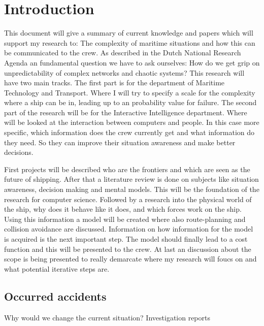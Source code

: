 \section*{Introduction}
\label{sec:introduction}

\noindent This document will give a summary of current knowledge and papers which will support my research to: The complexity of maritime situations and how this can be communicated to the crew.
As described in the Dutch National Research Agenda an fundamental question we have to ask ourselves: How do we get grip on unpredictability of complex networks and chaotic systems? 
This research will have two main tracks. The first part is for the department of Maritime Technology and Transport. Where I will try to specify a scale for the complexity where a ship can be in, leading up to an probability value for failure. The second part of the research will be for the Interactive Intelligence department. Where will be looked at the interaction between computers and people. In this case more specific, which information does the crew currently get and what information do they need. So they can improve their situation awareness and make better decisions.

First projects will be described who are the frontiers and which are seen as the future of shipping.
After that a literature review is done on subjects like situation awareness, decision making and mental models. This will be the foundation of the research for computer science. 
Followed by a research into the physical world of the ship, why does it behave like it does, and which forces work on the ship. Using this information a model will be created where also route-planning and collision avoidance are discussed. 
Information on how information for the model is acquired is the next important step. The model should finally lead to a cost function and this will be presented to the crew. 
At last an discussion about the scope is being presented to really demarcate where my research will foucs on and what potential iterative steps are. 

\subsection*{Occurred accidents}
Why would we change the current situation?
Investigation reports